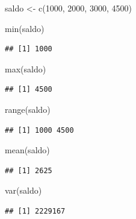 \documentclass[
  12pt,
]{book}
\newenvironment{Shaded}{\begin{snugshade}}{\end{snugshade}}
\newcommand{\DecValTok}[1]{\textcolor[rgb]{0.00,0.00,0.81}{#1}}
\newcommand{\FunctionTok}[1]{\textcolor[rgb]{0.00,0.00,0.00}{#1}}
\newcommand{\NormalTok}[1]{#1}
\newcommand{\OtherTok}[1]{\textcolor[rgb]{0.56,0.35,0.01}{#1}}
\begin{document}
\begin{Shaded}
\begin{Highlighting}[]
\NormalTok{saldo }\OtherTok{\textless{}{-}} \FunctionTok{c}\NormalTok{(}\DecValTok{1000}\NormalTok{, }\DecValTok{2000}\NormalTok{, }\DecValTok{3000}\NormalTok{, }\DecValTok{4500}\NormalTok{)}

\FunctionTok{min}\NormalTok{(saldo)}
\end{Highlighting}
\end{Shaded}

\begin{verbatim}
## [1] 1000
\end{verbatim}

\begin{Shaded}
\begin{Highlighting}[]
\FunctionTok{max}\NormalTok{(saldo)}
\end{Highlighting}
\end{Shaded}

\begin{verbatim}
## [1] 4500
\end{verbatim}

\begin{Shaded}
\begin{Highlighting}[]
\FunctionTok{range}\NormalTok{(saldo)}
\end{Highlighting}
\end{Shaded}

\begin{verbatim}
## [1] 1000 4500
\end{verbatim}

\begin{Shaded}
\begin{Highlighting}[]
\FunctionTok{mean}\NormalTok{(saldo)}
\end{Highlighting}
\end{Shaded}

\begin{verbatim}
## [1] 2625
\end{verbatim}

\begin{Shaded}
\begin{Highlighting}[]
\FunctionTok{var}\NormalTok{(saldo)}
\end{Highlighting}
\end{Shaded}

\begin{verbatim}
## [1] 2229167
\end{verbatim}
\end{document}
